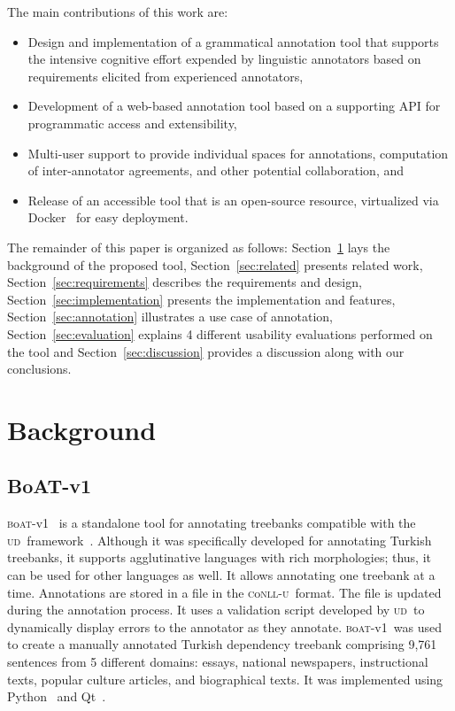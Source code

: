 \documentclass{elektr}
\newcommand{\conllu}{\textsc{c}o\textsc{nll-u}}
\newcommand{\boatvone}{\textsc{b}o\textsc{at}-{\scriptsize v1}}
\newcommand{\ud}{\textsc{ud}}
\begin{document}
The main contributions of this work are:
\begin{itemize}
\setlength\itemsep{0em}
        \item Design and implementation of a grammatical annotation tool that supports the intensive cognitive effort expended by linguistic annotators based on requirements elicited from experienced annotators,
        \item Development of a web-based annotation tool based on a supporting API for programmatic access and extensibility,
        \item Multi-user support to provide individual spaces for annotations, computation of inter-annotator agreements, and other potential collaboration, and
        \item Release of an accessible tool that is an open-source resource, virtualized via Docker~\cite{docker} for easy deployment.
\end{itemize}

The remainder of this paper is organized as follows:
Section~\ref{sec:background} lays the background of the proposed tool,
Section~\ref{sec:related} presents related work,
Section~\ref{sec:requirements} describes the requirements and design,
Section~\ref{sec:implementation} presents the implementation and features,
Section~\ref{sec:annotation} illustrates a use case of annotation,
Section~\ref{sec:evaluation} explains 4 different usability evaluations performed on the tool and
Section~\ref{sec:discussion} provides a discussion along with our conclusions.

% 
\section{Background}
\label{sec:background}

\subsection{BoAT-v1}
\label{sec:boatvone}

\boatvone~\cite{anon} is a standalone tool for annotating treebanks compatible with the \ud\ framework~\cite{ud}.
Although it was specifically developed for annotating Turkish treebanks, it supports agglutinative languages with rich morphologies; thus, it can be used for other languages as well.
It allows annotating one treebank at a time.
Annotations are stored in a file in the \conllu\ format.
The file is updated during the annotation process.
It uses a validation script developed by \ud\ to dynamically display errors to the annotator as they annotate.
\boatvone\ was used to create a manually annotated Turkish dependency treebank comprising 9,761 sentences from 5 different domains: essays, national newspapers, instructional texts, popular culture articles, and biographical texts.
It was implemented using Python~\cite{python} and Qt~\cite{qt}.
\end{document}
